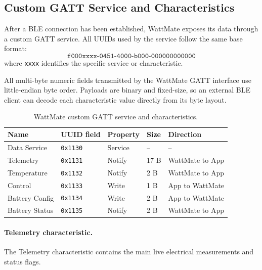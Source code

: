 \subsection{Custom GATT Service and Characteristics}
\label{sec:wattmate_custom_gatt_service}

After a BLE connection has been established, WattMate exposes its data through a custom GATT service. 
All UUIDs used by the service follow the same base format:
\[
\texttt{f000xxxx-0451-4000-b000-000000000000}
\]
where \texttt{xxxx} identifies the specific service or characteristic.

All multi-byte numeric fields transmitted by the WattMate GATT interface use little-endian byte order. 
Payloads are binary and fixed-size, so an external BLE client can decode each characteristic value directly from its byte layout.

\begin{table}[H]
	\centering
	\small
	\caption{WattMate custom GATT service and characteristics.}
	\label{tab:wattmate_gatt_characteristics}
	\begin{tabular}{p{} p{} p{} p{} p{}}
		\toprule
		\textbf{Name} & \textbf{UUID field} & \textbf{Property} & \textbf{Size} & \textbf{Direction} \\
		\midrule
		Data Service &
		\texttt{0x1130} &
		Service &
		-- &
		-- \\
		
		Telemetry &
		\texttt{0x1131} &
		Notify &
		17 B &
		WattMate to App \\
		
		Temperature &
		\texttt{0x1132} &
		Notify &
		2 B &
		WattMate to App \\
		
		Control &
		\texttt{0x1133} &
		Write &
		1 B &
		App to WattMate \\
		
		Battery Config &
		\texttt{0x1134} &
		Write &
		2 B &
		App to WattMate \\
		
		Battery Status &
		\texttt{0x1135} &
		Notify &
		2 B &
		WattMate to App \\
		\bottomrule
	\end{tabular}
\end{table}

\paragraph{Telemetry characteristic.}
The Telemetry characteristic contains the main live electrical measurements and status flags.

